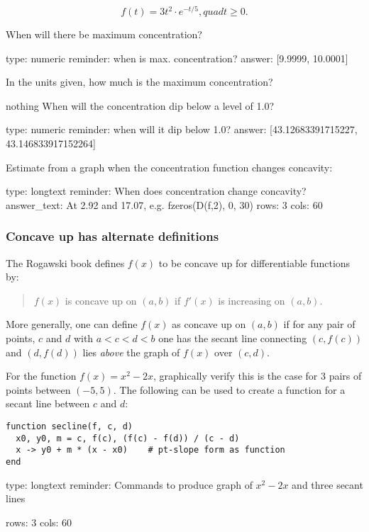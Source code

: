 \documentclass[12pt]{article}
\begin{document}
\[
f(t) =  3t^2 \cdot e^{-t/5}, quad t \geq 0.
\]

When will there be maximum concentration?

\begin{answer}
    type: numeric
    reminder: when is max. concentration?
    answer: [9.9999, 10.0001]

\end{answer}

In the units given, how much is the maximum concentration?

nothing
When will the concentration dip below a level of 1.0?

\begin{answer}
    type: numeric
    reminder: when will it dip below 1.0?
    answer: [43.12683391715227, 43.146833917152264]

\end{answer}

Estimate from a graph when the concentration function changes concavity:

\begin{answer}
type: longtext
reminder: When does concentration change concavity?
answer_text: At 2.92 and 17.07, e.g. fzeros(D(f,2), 0, 30) 
rows: 3
cols: 60
\end{answer}

\subsubsection{Concave up has alternate definitions}

The Rogawski book defines $f(x)$ to be concave up for differentiable
functions by:

\begin{quote}
$f(x)$ is concave up on $(a,b)$ if $f'(x)$ is increasing on $(a,b)$.
\end{quote}

More generally, one can define $f(x)$ as concave up on $(a,b)$ if for
any pair of points, $c$ and $d$ with $a < c < d < b$ one has the secant
line connecting $(c,f(c))$ and $(d,f(d))$ lies \emph{above} the graph of
$f(x)$ over $(c,d)$.

For the function $f(x) = x^2 - 2x$, graphically verify this is the case
for 3 pairs of points between $(-5,5)$. The following can be used to
create a function for a secant line between $c$ and $d$:



\begin{verbatim}
function secline(f, c, d)
  x0, y0, m = c, f(c), (f(c) - f(d)) / (c - d)
  x -> y0 + m * (x - x0)    # pt-slope form as function
end
\end{verbatim}
\begin{answer}
type: longtext
reminder: Commands to produce graph of \( x^2 - 2x \) and three secant lines

rows: 3
cols: 60
\end{answer}
\end{document}

